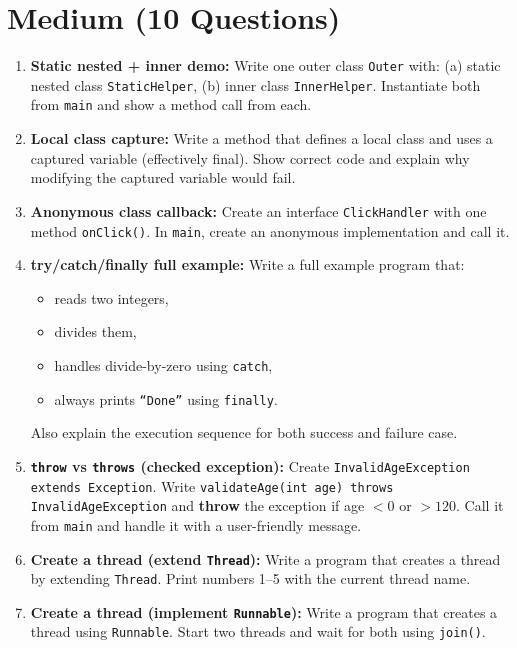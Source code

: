 \documentclass[11pt,a4paper]{article}
\begin{document}
\section*{Medium (10 Questions)}
\begin{enumerate}[label=M\arabic*., leftmargin=*]
  \item \textbf{Static nested + inner demo:} Write one outer class \texttt{Outer} with:
    (a) static nested class \texttt{StaticHelper}, (b) inner class \texttt{InnerHelper}.
    Instantiate both from \texttt{main} and show a method call from each.

  \item \textbf{Local class capture:} Write a method that defines a local class and uses a captured variable
    (effectively final). Show correct code and explain why modifying the captured variable would fail.

  \item \textbf{Anonymous class callback:} Create an interface \texttt{ClickHandler} with one method \texttt{onClick()}.
    In \texttt{main}, create an anonymous implementation and call it.

  \item \textbf{try/catch/finally full example:} Write a full example program that:
    \begin{itemize}[leftmargin=*]
      \item reads two integers,
      \item divides them,
      \item handles divide-by-zero using \texttt{catch},
      \item always prints \texttt{``Done''} using \texttt{finally}.
    \end{itemize}
    Also explain the execution sequence for both success and failure case.

  \item \textbf{\texttt{throw} vs \texttt{throws} (checked exception):} Create \texttt{InvalidAgeException extends Exception}.
    Write \texttt{validateAge(int age) throws InvalidAgeException} and \textbf{throw} the exception if age $< 0$ or $> 120$.
    Call it from \texttt{main} and handle it with a user-friendly message.

  \item \textbf{Create a thread (extend \texttt{Thread}):} Write a program that creates a thread by extending \texttt{Thread}.
    Print numbers 1--5 with the current thread name.

  \item \textbf{Create a thread (implement \texttt{Runnable}):} Write a program that creates a thread using \texttt{Runnable}.
    Start two threads and wait for both using \texttt{join()}.


\end{enumerate}
\end{document}
